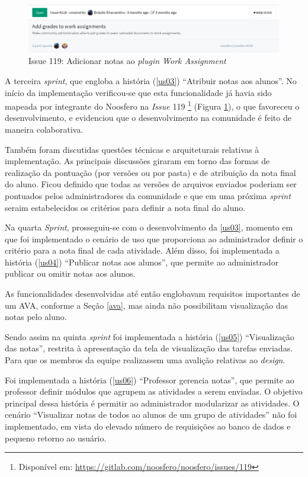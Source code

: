 \begin{figure}[h]
    \centering
    \includegraphics[keepaspectratio=true,scale=0.4]
      {figuras/issue119.eps}
    \caption{Issue 119: Adicionar notas ao \textit{plugin Work Assignment}}
    \label{fig:issue-119}
\end{figure}

A terceira \textit{sprint}, que engloba a história (\ref{us03}) ``Atribuir notas aos alunos''. No início da implementação verificou-se que esta funcionalidade já havia sido mapeada por integrante do Noosfero na \textit{Issue} 119 \footnote{Disponível em: \url{https://gitlab.com/noosfero/noosfero/issues/119}} (Figura \ref{fig:issue-119}), o que favoreceu o desenvolvimento, e evidenciou que o desenvolvimento na comunidade é feito de maneira colaborativa.

Também foram discutidas questões técnicas e arquiteturais relativas à implementação. As principais discussões giraram em torno das formas de realização da pontuação (por versões ou por pasta) e de atribuição da nota final do aluno. Ficou definido que todas as versões de arquivos enviados poderiam ser pontuados pelos administradores da comunidade e que em uma próxima \textit{sprint} seraim estabelecidos os critérios para definir a nota final do aluno.

Na quarta \textit{Sprint}, prosseguiu-se com o desenvolvimento da \ref{us03}, momento em que foi implementado o cenário de uso que proporciona ao administrador definir o critério para a nota final de cada atividade.  Além disso, foi implementada a história (\ref{us04}) ``Publicar notas aos alunos'', que permite ao administrador publicar ou omitir notas aos alunos. 

As funcionalidades desenvolvidas até então englobavam requisitos importantes de um AVA, conforme a Seção \ref{ava}, mas ainda não possibilitam visualização das notas pelo aluno.

Sendo assim na quinta \textit{sprint} foi implementada a história (\ref{us05}) ``Visualização das notas'', restrita à apresentação da tela de visualização das tarefas enviadas. Para que os membros da equipe realizassem uma avalição relativas ao \textit{design}.

Foi implementada a história (\ref{us06}) ``Professor gerencia notas'', que permite ao professor definir módulos que agrupem as atividades a serem enviadas. O objetivo principal dessa história é permitir ao administrador modularizar as atividades. O cenário ``Visualizar notas de todos ao alunos de um grupo de atividades'' não foi implementado, em vista do elevado número de requisições ao banco de dados e pequeno retorno ao usuário.

